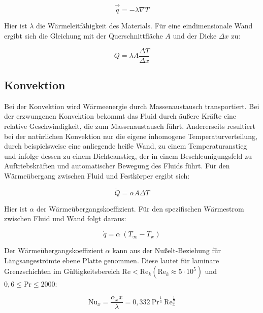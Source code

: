 \begin{equation}
  \label{eq:fourier}
  \vec{\dot{q}} = -\lambda \nabla T
\end{equation}

Hier ist $\lambda$ die Wärmeleitfähigkeit des Materials.
Für eine eindimensionale Wand ergibt sich die Gleichung mit der Querschnittfläche $A$ und der Dicke $\Delta x$ zu:

\begin{equation}
  \label{eq:fourier_1d}
  \dot{Q} = \lambda A \frac{\Delta T}{\Delta x}
\end{equation}

\subsection{Konvektion}\label{sec:konvektion}

Bei der Konvektion wird Wärmeenergie durch Massenaustausch transportiert. Bei der erzwungenen Konvektion bekommt das Fluid durch äußere Kräfte
eine relative Geschwindigkeit, die zum Massenaustausch führt. Andererseits resultiert bei der natürlichen Konvektion nur die eigene
inhomogene Temperaturverteilung, durch beispielsweise eine anliegende heiße Wand, zu einem Temperaturanstieg und infolge dessen zu einem
Dichteanstieg, der in einem Beschleunigungsfeld zu Auftriebskräften und automatischer Bewegung des Fluids führt.
Für den Wärmeübergang zwischen Fluid und Festkörper ergibt sich:

\begin{equation}
    \dot{Q}=\alpha A \Delta T 
\end{equation}

Hier ist $\alpha$ der Wärmeübergangskoeffizient.
Für den spezifischen Wärmestrom zwischen Fluid und Wand folgt daraus:

\begin{equation}
  \label{eq:qdot_freestream}
  \dot{q} = \alpha \ (T_{\infty} - T_\text{w})
\end{equation}

Der Wärmeübergangskoeffizient $\alpha$ kann aus der Nußelt-Beziehung für Längsangeströmte ebene Platte genommen. Diese lautet
für laminare Grenzschichten im Gültigkeitsbereich $\text{Re} < \text{Re}_k \left(\text{Re}_k \approx 5 \cdot 10^5\right)$ und $0,6 \leq \text{Pr} \leq 2000$:

\begin{equation}
  \label{eq:nusselt_laminar}
  \text{Nu}_x = \frac{\alpha_x x}{\lambda} = 0,332 \ \text{Pr}^{\frac{1}{3}} \ \text{Re}_x^{\frac{1}{2}}
\end{equation}


